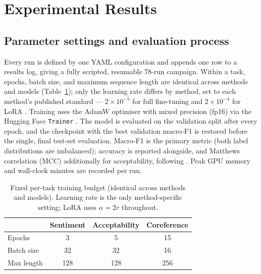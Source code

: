 
\section{Experimental Results}
\label{sec:results}

\subsection{Parameter settings and evaluation process}
\label{sec:params}

Every run is defined by one YAML configuration and appends one row to a
results log, giving a fully scripted, resumable 78-run campaign. Within a
task, epochs, batch size, and maximum sequence length are identical across
methods and models (Table~\ref{tab:params}); only the learning rate differs
by method, set to each method's published standard --- $2\times10^{-5}$ for
full fine-tuning and $2\times10^{-4}$ for LoRA \citep{hu2022lora}. Training
uses the AdamW optimiser \citep{loshchilov2019adamw} with mixed precision
(fp16) via the Hugging Face \texttt{Trainer} \citep{wolf2020transformers}.
The model is evaluated on the validation split after every epoch, and the
checkpoint with the best validation macro-F1 is restored before the single,
final test-set evaluation. Macro-F1 is the primary metric (both label
distributions are imbalanced); accuracy is reported alongside, and Matthews
correlation (MCC) additionally for acceptability, following
\citet{warstadt2019cola}. Peak GPU memory and wall-clock minutes are
recorded per run.

\begin{table}[t]
  \centering
  \caption{Fixed per-task training budget (identical across methods and
  models). Learning rate is the only method-specific setting; LoRA uses
  $\alpha = 2r$ throughout.}
  \label{tab:params}
  \begin{tabular}{lccc}
    \toprule
    & Sentiment & Acceptability & Coreference \\
    \midrule
    Epochs          & 3   & 5   & 15  \\
    Batch size      & 32  & 32  & 16  \\
    Max length      & 128 & 128 & 256 \\
    \bottomrule
  \end{tabular}
\end{table}

